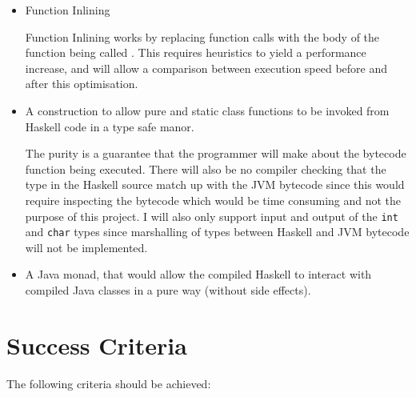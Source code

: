 \documentclass[a4paper]{article}
\begin{document}
  \begin{itemize}
    \item Function Inlining

      Function Inlining works by replacing function calls with the body of the function being called \cite{ghc-inliner}.  
      This requires heuristics to yield a performance increase, and will allow a comparison between execution speed before and after this optimisation.
    
    \item A construction to allow pure and static class functions to be invoked from Haskell code in a type safe manor.

      The purity is a guarantee that the programmer will make about the bytecode function being executed.
      There will also be no compiler checking that the type in the Haskell source match up with the JVM bytecode since this would require inspecting the bytecode which 
      would be time consuming and not the purpose of this project. I will also only support input and output of the \texttt{int} and \texttt{char} types since
      marshalling of types between Haskell and JVM bytecode will not be implemented.

    \item A Java monad, that would allow the compiled Haskell to interact with compiled Java classes in a pure way (without side effects).

  \end{itemize}

  \section*{Success Criteria}

  The following criteria should be achieved:
\end{document}
